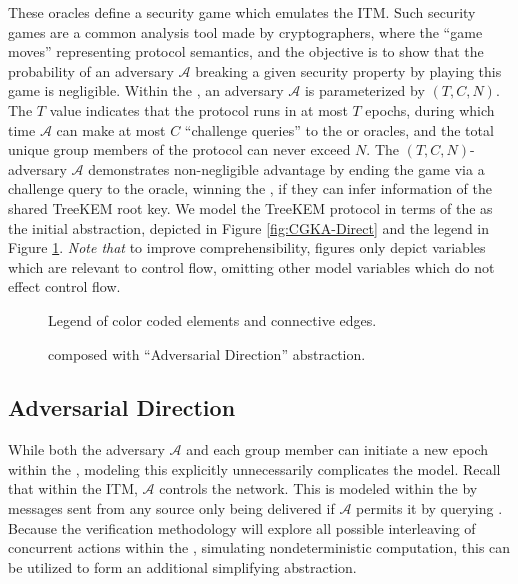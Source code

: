 \documentclass[authordraft,sigconf]{acmart}
\newcommand{\Abrev}[1]{\gls{#1}}
\newcommand{\Adversary}{\ensuremath{\mathcal{A}}\xspace}
\begin{document}
These oracles define a security game \cite{shoup2004sequences} which emulates the \Abrev{ITM}.
Such security games are a common analysis tool made by cryptographers, where the ``game moves'' representing protocol semantics, and the objective is to show that the probability of an adversary \Adversary  breaking a given security property by playing this game is negligible.
Within the \CGKAsec, an adversary \Adversary is parameterized by \((T, C, N)\).
The \(T\) value indicates that the protocol runs in at most \(T\) epochs, during which time \(\mathcal{A}\) can make at most \(C\) ``challenge queries'' to the  or  oracles, and the total unique group members of the protocol can never exceed \(N\).
The \((T, C, N)\)-adversary \(\mathcal{A}\) demonstrates non-negligible advantage by ending the game via a challenge query to the  oracle, winning the \CGKAsec, if they can infer information of the shared TreeKEM root key.
We model the TreeKEM protocol in terms of the \CGKAsec as the initial abstraction, depicted in Figure \ref{fig:CGKA-Direct} and the legend in Figure \ref{fig:CGKA-Legend}.
\emph{Note that} to improve comprehensibility, figures only depict variables which are relevant to control flow, omitting other model variables which do not effect control flow.


\begin{figure}[ht!]
\centering
{}
\caption{Legend of color coded elements and connective edges.\label{fig:CGKA-Legend}}%
\end{figure}

\begin{figure*}
\centering
{}
\caption[Transition graph of informal CGKA definition]{%
\label{fig:CGKA-Direct}%
High-level illustration of the \CGKAsec formalization.\ %
}%
\vfill
{}
\caption[Transition graph of informal CGKA definition]{%
\label{fig:CGKA-Adversarial-Driven}%
\CGKAsec composed with ``Adversarial Direction'' abstraction.%
}%
\end{figure*}


\subsection{Adversarial Direction}
While both the adversary \Adversary and each group member can initiate a new epoch within the \CGKAsec, modeling this explicitly unnecessarily complicates the model.
Recall that within the \Abrev{ITM}, \Adversary controls the network.
This is modeled within the \CGKAsec by messages sent from any source only being delivered if \Adversary permits it by querying .
Because the verification methodology will explore all possible interleaving of concurrent actions within the \CGKAsec, simulating nondeterministic computation, this can be utilized to form an additional simplifying abstraction.
\end{document}
